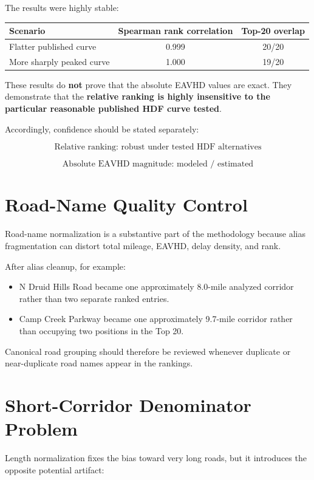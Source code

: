 \documentclass[11pt]{article}
\begin{document}
The results were highly stable:

\begin{center}
\begin{tabular}{lcc}
\toprule
Scenario & Spearman rank correlation & Top-20 overlap \\
\midrule
Flatter published curve & 0.999 & 20/20 \\
More sharply peaked curve & 1.000 & 19/20 \\
\bottomrule
\end{tabular}
\end{center}

These results do \textbf{not} prove that the absolute EAVHD values are exact. They demonstrate that the \textbf{relative ranking is highly insensitive to the particular reasonable published HDF curve tested}.

Accordingly, confidence should be stated separately:

\[
\boxed{\text{Relative ranking: robust under tested HDF alternatives}}
\]

\[
\boxed{\text{Absolute EAVHD magnitude: modeled / estimated}}
\]

\section{Road-Name Quality Control}

Road-name normalization is a substantive part of the methodology because alias fragmentation can distort total mileage, EAVHD, delay density, and rank.

After alias cleanup, for example:

\begin{itemize}
    \item N Druid Hills Road became one approximately 8.0-mile analyzed corridor rather than two separate ranked entries.
    \item Camp Creek Parkway became one approximately 9.7-mile corridor rather than occupying two positions in the Top 20.
\end{itemize}

Canonical road grouping should therefore be reviewed whenever duplicate or near-duplicate road names appear in the rankings.

\section{Short-Corridor Denominator Problem}

Length normalization fixes the bias toward very long roads, but it introduces the opposite potential artifact:
\end{document}
